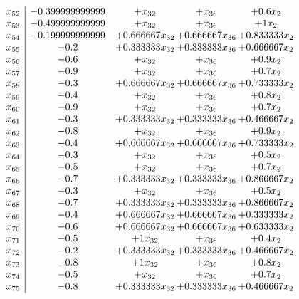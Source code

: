 \documentclass[11pt]{article}
\begin{document}
\[\begin{array}{c| c c@{\hskip 2pt} c@{\hskip 2pt} c@{\hskip 2pt} }
 x_{52}   &  -0.399999999999 & +  x_{32} & +  x_{36} & + 0.6 x_{2}\\
 x_{53}   &  -0.499999999999 & +  x_{32} & +  x_{36} & + 1 x_{2}\\
 x_{54}   &  -0.199999999999 & + 0.666667 x_{32} & + 0.666667 x_{36} & + 0.833333 x_{2}\\
 x_{55}   &  -0.2 & + 0.333333 x_{32} & + 0.333333 x_{36} & + 0.666667 x_{2}\\
 x_{56}   &  -0.6 & +  x_{32} & +  x_{36} & + 0.9 x_{2}\\
 x_{57}   &  -0.9 & +  x_{32} & +  x_{36} & + 0.7 x_{2}\\
 x_{58}   &  -0.3 & + 0.666667 x_{32} & + 0.666667 x_{36} & + 0.733333 x_{2}\\
 x_{59}   &  -0.4 & +  x_{32} & +  x_{36} & + 0.8 x_{2}\\
 x_{60}   &  -0.9 & +  x_{32} & +  x_{36} & + 0.7 x_{2}\\
 x_{61}   &  -0.3 & + 0.333333 x_{32} & + 0.333333 x_{36} & + 0.466667 x_{2}\\
 x_{62}   &  -0.8 & +  x_{32} & +  x_{36} & + 0.9 x_{2}\\
 x_{63}   &  -0.4 & + 0.666667 x_{32} & + 0.666667 x_{36} & + 0.733333 x_{2}\\
 x_{64}   &  -0.3 & +  x_{32} & +  x_{36} & + 0.5 x_{2}\\
 x_{65}   &  -0.5 & +  x_{32} & +  x_{36} & + 0.7 x_{2}\\
 x_{66}   &  -0.7 & + 0.333333 x_{32} & + 0.333333 x_{36} & + 0.866667 x_{2}\\
 x_{67}   &  -0.3 & +  x_{32} & +  x_{36} & + 0.5 x_{2}\\
 x_{68}   &  -0.7 & + 0.333333 x_{32} & + 0.333333 x_{36} & + 0.866667 x_{2}\\
 x_{69}   &  -0.4 & + 0.666667 x_{32} & + 0.666667 x_{36} & + 0.333333 x_{2}\\
 x_{70}   &  -0.6 & + 0.666667 x_{32} & + 0.666667 x_{36} & + 0.633333 x_{2}\\
 x_{71}   &  -0.5 & + 1 x_{32} & +  x_{36} & + 0.4 x_{2}\\
 x_{72}   &  -0.2 & + 0.333333 x_{32} & + 0.333333 x_{36} & + 0.466667 x_{2}\\
 x_{73}   &  -0.8 & + 1 x_{32} & +  x_{36} & + 0.8 x_{2}\\
 x_{74}   &  -0.5 & +  x_{32} & +  x_{36} & + 0.7 x_{2}\\
 x_{75}   &  -0.8 & + 0.333333 x_{32} & + 0.333333 x_{36} & + 0.466667 x_{2}\\

\end{array}\]
\end{document}
